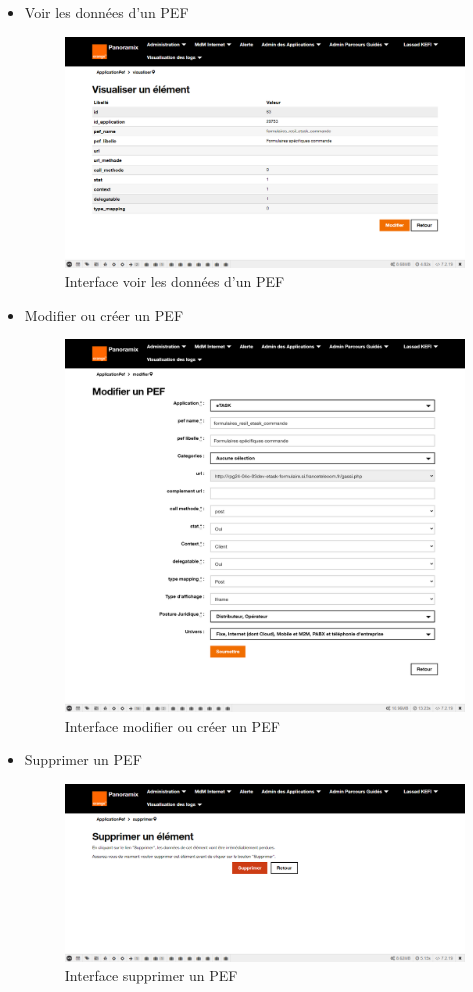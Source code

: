\begin{itemize}
	\item Voir les données d'un PEF
	\begin{figure}[H]
		\centering
		\includegraphics[width=0.55\linewidth]{img/screenshots/pef/view}
		\caption[Interface voir les données d'un PEF]{Interface voir les données d'un PEF}
		\label{fig:view-pef}
	\end{figure}
	\newpage
	\item Modifier ou créer un PEF
	\begin{figure}[H]
		\centering
		\includegraphics[width=0.7\linewidth]{img/screenshots/pef/edit}
		\caption[Interface modifier ou créer un PEF]{Interface modifier ou créer un PEF}
		\label{fig:create-pef}
	\end{figure}
	
	\item Supprimer un PEF
	\begin{figure}[H]
		\centering
		\includegraphics[width=0.7\linewidth]{img/screenshots/pef/delete}
		\caption[Interface supprimer un PEF]{Interface supprimer un PEF}
		\label{fig:delete-pef}
	\end{figure}
\end{itemize}
\newpage
